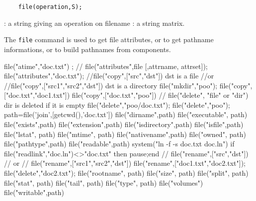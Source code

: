 \begin{mandesc}
\end{mandesc}

\begin{calling_sequence}
  \begin{verbatim}
    file(operation,S);
  \end{verbatim}
\end{calling_sequence}
\begin{parameters}
  \begin{varlist}
    : a string giving an operation on filename
    : a string matrix.
  \end{varlist}
\end{parameters}
\begin{mandescription}
  The \verb!file! command is used to get file attributes, or 
  to get pathname informations, or to build pathnames from 
  components.
\end{mandescription}
\begin{examples}
  \begin{nspcode}
    file("atime","doc.txt") ;
    // file("attributes",file [,attrname, attrset]);
    file("attributes","doc.txt");
    //file("copy",["src","dst"])	    dst is a file 
    //or 
    //file("copy",["src1","src2","dst"])  dst is a directory 
    file("mkdir","poo");
    file("copy",["doc.txt","doc1.txt"]) 
    file("copy",["doc.txt","poo"]) 
    // file("delete", "file" or "dir")     dir is deleted if it is empty 
    file("delete","poo/doc.txt");
    file("delete","poo");
    path=file('join',[getcwd(),'doc.txt'])
    file("dirname",path)
    file("executable", path)
    file("exists",path)
    file("extension",path)
    file("isdirectory",path)
    file("isfile",path) 
    file("lstat", path) 
    file("mtime", path) 
    file("nativename",path)
    file("owned", path)
    file("pathtype",path) 
    file("readable",path) 
    system("ln -f -s doc.txt doc.ln")
    if file("readlink","doc.ln")<>"doc.txt" then pause;end
    // file("rename",["src","dst"])
    // or 
    // file("rename",["src1","src2","dst"])
    file("rename",["doc1.txt","doc2.txt"]);
    file("delete","doc2.txt");
    file("rootname", path)
    file("size", path)
    file("split", path)
    file("stat", path)
    file("tail", path)
    file("type", path)
    file("volumes")
    file("writable",path)
  \end{nspcode}
\end{examples}
\begin{manseealso}
\end{manseealso}

